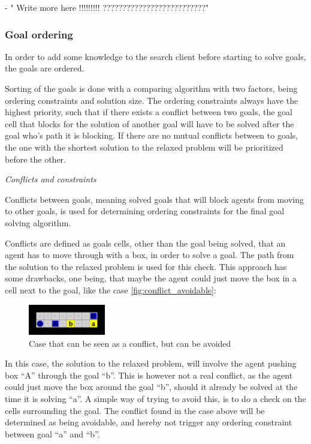 \documentclass[Main]{subfiles}
\begin{document}
- " Write more here !!!!!!!!! ??????????????????????????"



\subsubsection{Goal ordering}

In order to add some knowledge to the search client before starting to solve goals, the goals are ordered. 

Sorting of the goals is done with a comparing algorithm with two factors, being ordering constraints and solution size. The ordering constraints always have the highest priority, such that if there exists a conflict between two goals, the goal cell that blocks for the solution of another goal will have to be solved after the goal who's path it is blocking. If there are no mutual conflicts between to goals, the one with the shortest solution to the relaxed problem will be prioritized before the other. 


\textit{Conflicts and constraints}

Conflicts between goals, meaning solved goals that will block agents from moving to other goals, is used for determining ordering constraints for the final goal solving algorithm. 

Conflicts are defined as goals cells, other than the goal being solved, that an agent has to move through with a box, in order to solve a goal. The path from the solution to the relaxed problem is used for this check. This approach has some drawbacks, one being, that maybe the agent could just move the box in a cell next to the goal, like the case \autoref{fig:conflict_avoidable}:
\begin{figure}[h!]
    \centering
    \includegraphics[width=0.3\textwidth]{conflict.png}
    \caption{Case that can be seen as a conflict, but can be avoided}
    \label{fig:conflict_avoidable}
\end{figure}


In this case, the solution to the relaxed problem, will involve the agent pushing box ``A'' through the goal ``b''. This is however not a real conflict, as the agent could just move the box around the goal ``b'', should it already be solved at the time it is solving ``a''. A simple way of trying to avoid this, is to do a check on the cells surrounding the goal. 
The conflict found in the case above will be determined as being avoidable, and hereby not trigger any ordering constraint between goal ``a'' and ``b''. 
\end{document}
